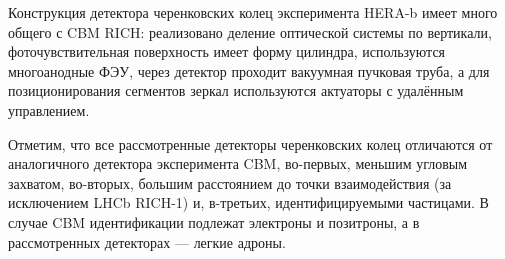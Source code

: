 Конструкция детектора черенковских колец эксперимента \mbox{HERA-b} имеет много общего с CBM RICH: 
реализовано деление оптической системы по вертикали,
фоточувствительная поверхность имеет форму цилиндра,
используются многоанодные ФЭУ,
через детектор проходит вакуумная пучковая труба,
а для позиционирования сегментов зеркал используются актуаторы с удалённым управлением.


Отметим, что все рассмотренные детекторы черенковских колец отличаются от аналогичного детектора эксперимента CBM, во-первых, меньшим угловым захватом, во-вторых, большим расстоянием до точки взаимодействия (за исключением LHCb \mbox{RICH-1}) и, в-третьих, идентифицируемыми частицами. В случае CBM идентификации подлежат электроны и позитроны, а в рассмотренных детекторах --- легкие адроны.

